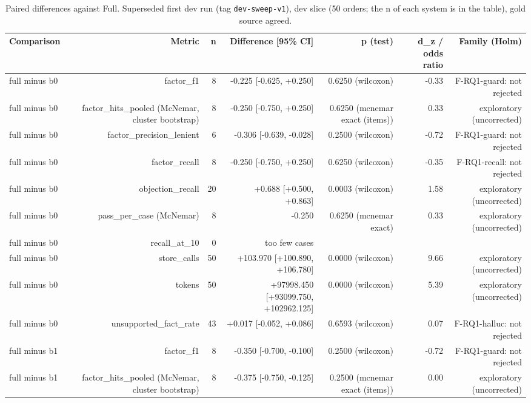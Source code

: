 \begin{table}[t]
\centering
\small
\caption{Paired differences against Full. Superseded first dev run (tag \texttt{dev-sweep-v1}), dev slice (50 orders; the n of each system is in the table), gold source agreed.}
\label{tab:table_paired}
\begin{adjustbox}{max width=\textwidth}
\begin{tabular}{lrrrrrr}
\toprule
Comparison & Metric & n & Difference [95\% CI] & p (test) & d\_z / odds ratio & Family (Holm) \\
\midrule
full minus b0 & factor\_f1 & 8 & -0.225 [-0.625, +0.250] & 0.6250 (wilcoxon) & -0.33 & F-RQ1-guard: not rejected \\
full minus b0 & factor\_hits\_pooled (McNemar, cluster bootstrap) & 8 & -0.250 [-0.750, +0.250] & 0.6250 (mcnemar exact (items)) & 0.33 & exploratory (uncorrected) \\
full minus b0 & factor\_precision\_lenient & 6 & -0.306 [-0.639, -0.028] & 0.2500 (wilcoxon) & -0.72 & F-RQ1-guard: not rejected \\
full minus b0 & factor\_recall & 8 & -0.250 [-0.750, +0.250] & 0.6250 (wilcoxon) & -0.35 & F-RQ1-recall: not rejected \\
full minus b0 & objection\_recall & 20 & +0.688 [+0.500, +0.863] & 0.0003 (wilcoxon) & 1.58 & exploratory (uncorrected) \\
full minus b0 & pass\_per\_case (McNemar) & 8 & -0.250 & 0.6250 (mcnemar exact) & 0.33 & exploratory (uncorrected) \\
full minus b0 & recall\_at\_10 & 0 & too few cases &  &  &  \\
full minus b0 & store\_calls & 50 & +103.970 [+100.890, +106.780] & 0.0000 (wilcoxon) & 9.66 & exploratory (uncorrected) \\
full minus b0 & tokens & 50 & +97998.450 [+93099.750, +102962.125] & 0.0000 (wilcoxon) & 5.39 & exploratory (uncorrected) \\
full minus b0 & unsupported\_fact\_rate & 43 & +0.017 [-0.052, +0.086] & 0.6593 (wilcoxon) & 0.07 & F-RQ1-halluc: not rejected \\
full minus b1 & factor\_f1 & 8 & -0.350 [-0.700, -0.100] & 0.2500 (wilcoxon) & -0.72 & F-RQ1-guard: not rejected \\
full minus b1 & factor\_hits\_pooled (McNemar, cluster bootstrap) & 8 & -0.375 [-0.750, -0.125] & 0.2500 (mcnemar exact (items)) & 0.00 & exploratory (uncorrected) \\

\end{tabular}
\end{adjustbox}
\end{table}
